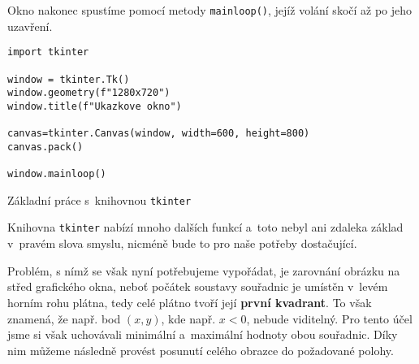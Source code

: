 Okno nakonec spustíme pomocí metody \texttt{mainloop()}, jejíž volání skočí až po jeho uzavření.
\begin{program}[h]
\begin{lstlisting}[style=python]
import tkinter

window = tkinter.Tk()
window.geometry(f"1280x720")
window.title(f"Ukazkove okno")

canvas=tkinter.Canvas(window, width=600, height=800)
canvas.pack()

window.mainloop()
\end{lstlisting}
    \caption{Základní práce s~knihovnou \texttt{tkinter}}
    \label{prog:tkinter-zaklad}
\end{program}

Knihovna \texttt{tkinter} nabízí mnoho dalších funkcí a~toto nebyl ani zdaleka základ v~pravém slova smyslu, nicméně bude to pro naše potřeby dostačující.

Problém, s nímž se však nyní potřebujeme vypořádat, je zarovnání obrázku na střed grafického okna, neboť počátek soustavy souřadnic je umístěn v~levém horním rohu plátna, tedy celé plátno tvoří její \textbf{první kvadrant}. To však znamená, že např. bod $(x,y)$, kde např. $x<0$, nebude viditelný. Pro tento účel jsme si však uchovávali minimální a~maximální hodnoty obou souřadnic. Díky nim můžeme následně provést posunutí celého obrazce do požadované polohy.

